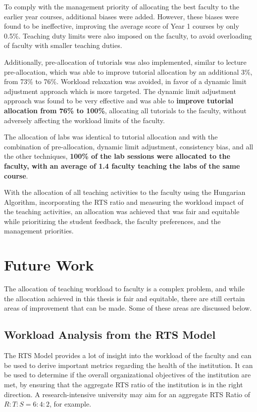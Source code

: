 To comply with the management priority of allocating the best faculty to the earlier year courses, additional biases were added. However, these biases were found to be ineffective, improving the average score of Year 1 courses by only 0.5\%. Teaching duty limits were also imposed on the faculty, to avoid overloading of faculty with smaller teaching duties.

Additionally, pre-allocation of tutorials was also implemented, similar to lecture pre-allocation, which was able to improve tutorial allocation by an additional 3\%, from 73\% to 76\%. Workload relaxation was avoided, in favor of a dynamic limit adjustment approach which is more targeted. The dynamic limit adjustment approach was found to be very effective and was able to \textbf{improve tutorial allocation from 76\% to 100\%}, allocating all tutorials to the faculty, without adversely affecting the workload limits of the faculty.

The allocation of labs was identical to tutorial allocation and with the combination of pre-allocation, dynamic limit adjustment, consistency bias, and all the other techniques, \textbf{100\% of the lab sessions were allocated to the faculty, with an average of 1.4 faculty teaching the labs of the same course}.

With the allocation of all teaching activities to the faculty using the Hungarian Algorithm, incorporating the RTS ratio and measuring the workload impact of the teaching activities, an allocation was achieved that was fair and equitable while prioritizing the student feedback, the faculty preferences, and the management priorities.

\section{Future Work}

The allocation of teaching workload to faculty is a complex problem, and while the allocation achieved in this thesis is fair and equitable, there are still certain areas of improvement that can be made. Some of these areas are discussed below.

\subsection{Workload Analysis from the RTS Model}

The RTS Model provides a lot of insight into the workload of the faculty and can be used to derive important metrics regarding the health of the institution. It can be used to determine if the overall organizational objectives of the institution are met, by ensuring that the aggregate RTS ratio of the institution is in the right direction. A research-intensive university may aim for an aggregate RTS Ratio of $R:T:S = 6:4:2$, for example.

